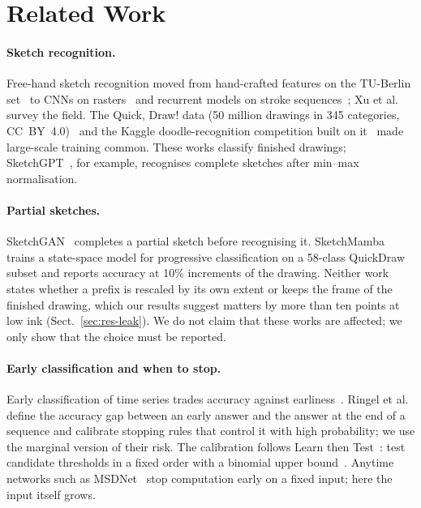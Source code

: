 \section{Related Work}
\label{sec:related}

\paragraph{Sketch recognition.}
Free-hand sketch recognition moved from hand-crafted features on the TU-Berlin
set~\cite{eitz2012humans} to CNNs on rasters~\cite{yu2017sketchanet} and recurrent models on
stroke sequences~\cite{ha2018sketchrnn}; Xu et al.~\cite{xu2023survey} survey the field. The
Quick, Draw! data (50 million drawings in 345 categories, CC~BY~4.0)~\cite{quickdraw_dataset} and
the Kaggle doodle-recognition competition built on it~\cite{kaggle_quickdraw} made large-scale
training common. These works classify finished drawings; SketchGPT~\cite{tiwari2024sketchgpt}, for
example, recognises complete sketches after min--max normalisation.

\paragraph{Partial sketches.}
SketchGAN~\cite{liu2019sketchgan} completes a partial sketch before recognising it.
SketchMamba~\cite{jhaveri2026sketchmamba} trains a state-space model for progressive
classification on a 58-class QuickDraw subset and reports accuracy at 10\% increments of the
drawing. Neither work states whether a prefix is rescaled by its own extent or keeps the frame of
the finished drawing, which our results suggest matters by more than ten points at low ink
(Sect.~\ref{sec:res-leak}). We do not claim that these works are affected; we only show that the
choice must be reported.

\paragraph{Early classification and when to stop.}
Early classification of time series trades accuracy against earliness~\cite{mori2018early}.
Ringel et al.~\cite{ringel2024early} define the accuracy gap between an early answer and the answer
at the end of a sequence and calibrate stopping rules that control it with high probability; we
use the marginal version of their risk. The calibration follows Learn then
Test~\cite{angelopoulos2021ltt}: test candidate thresholds in a fixed order with a binomial upper
bound~\cite{clopper1934}. Anytime networks such as MSDNet~\cite{huang2018msdnet} stop computation
early on a fixed input; here the input itself grows.

